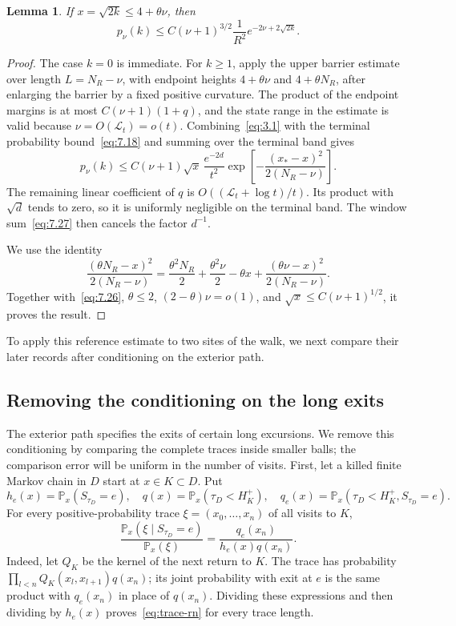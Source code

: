 \documentclass[11pt,a4paper]{article}
\numberwithin{equation}{section}
\newtheorem{lemma}[theorem]{Lemma}
\theoremstyle{remark}
\begin{document}
\begin{lemma}\label{lem:continuation}
If $x=\sqrt{2k}\le4+\theta\nu$, then
\begin{equation}\label{eq:7.30}
p_{\nu}(k)\le C(\nu+1)^{3/2}\frac{1}{R^2}
 e^{-2\nu+2\sqrt{2k}}.
\end{equation}
\end{lemma}
\begin{proof}
The case $k=0$ is immediate. For $k\ge1$, apply the upper barrier estimate over length $L=N_R-\nu$, with endpoint heights $4+\theta\nu$ and $4+\theta N_R$, after enlarging the barrier by a fixed positive curvature. The product of the endpoint margins is at most $C(\nu+1)(1+q)$, and the state range in the estimate is valid because $\nu=O(\mathcal L_t)=o(t)$. Combining~\eqref{eq:3.1} with the terminal probability bound~\eqref{eq:7.18} and summing over the terminal band gives
\begin{equation}\label{eq:7.31}
p_{\nu}(k)\le C(\nu+1)\sqrt{x}\,\frac{e^{-2d}}{t^2}
\exp\left[-\frac{(x_*-x)^2}{2(N_R-\nu)}\right].
\end{equation}
The remaining linear coefficient of $q$ is $O((\mathcal L_t+\log t)/t)$. Its product with $\sqrt d$ tends to zero, so it is uniformly negligible on the terminal band. The window sum~\eqref{eq:7.27} then cancels the factor $d^{-1}$.

We use the identity
\begin{equation}\label{eq:7.32}
\frac{(\theta N_R-x)^2}{2(N_R-\nu)}
=\frac{\theta^2N_R}{2}+\frac{\theta^2\nu}{2}-\theta x
+\frac{(\theta \nu-x)^2}{2(N_R-\nu)}.
\end{equation}
Together with~\eqref{eq:7.26}, $\theta\le2$, $(2-\theta)\nu=o(1)$, and $\sqrt x\le C(\nu+1)^{1/2}$, it proves the result.
\end{proof}
To apply this reference estimate to two sites of the walk, we next compare their later records after conditioning on the exterior path.

\subsection{Removing the conditioning on the long exits}\label{sec:exterior}\label{sec:exitkernel}
The exterior path specifies the exits of certain long excursions. We remove this conditioning by comparing the complete traces inside smaller balls; the comparison error will be uniform in the number of visits. First, let a killed finite Markov chain in $D$ start at $x\in K\subset D$. Put
\[
 h_e(x)=\mathbb P_x(S_{\tau_D}=e),\quad
 q(x)=\mathbb P_x(\tau_D<H_K^+),\quad
 q_e(x)=\mathbb P_x(\tau_D<H_K^+,S_{\tau_D}=e).
\]
For every positive-probability trace $\xi=(x_0,\ldots,x_n)$ of all visits to $K$,
\begin{equation}\label{eq:trace-rn}
 \frac{\mathbb P_x(\xi\mid S_{\tau_D}=e)}{\mathbb P_x(\xi)}
 =\frac{q_e(x_n)}{h_e(x)q(x_n)}.
\end{equation}
Indeed, let $Q_K$ be the kernel of the next return to $K$. The trace has probability $\prod_{l<n}Q_K(x_l,x_{l+1})q(x_n)$; its joint probability with exit at $e$ is the same product with $q_e(x_n)$ in place of $q(x_n)$. Dividing these expressions and then dividing by $h_e(x)$ proves~\eqref{eq:trace-rn} for every trace length.
\end{document}
